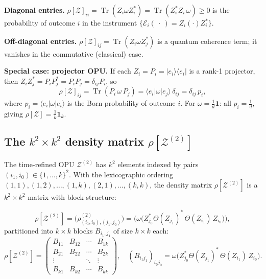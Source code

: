 \documentclass[12pt,a4paper]{article}
\DeclareMathOperator{\Tr}{Tr}
\begin{document}
\noindent\textbf{Diagonal entries.}
$\rho[\mathcal{Z}]_{ii} = \Tr(Z_i\omega Z_i^*) = \Tr(Z_i^*Z_i\,\omega) \geq 0$
is the probability of outcome $i$ in the instrument $\{\mathcal{E}_i(\ \cdot\ )=Z_i(\cdot)Z_i^*\}$.

\noindent\textbf{Off-diagonal entries.}
$\rho[\mathcal{Z}]_{ij} = \Tr(Z_i\omega Z_j^*)$ is a quantum coherence term;
it vanishes in the commutative (classical) case.

\noindent\textbf{Special case: projector OPU.}  If each $Z_i=P_i=|e_i\rangle\langle e_i|$
is a rank-1 projector, then $Z_i Z_j^* = P_i P_j^* = P_i P_j = \delta_{ij}P_i$, so
\begin{equation}
  \rho[\mathcal{Z}]_{ij}
  = \Tr(P_i\,\omega\,P_j)
  = \langle e_i|\omega|e_j\rangle\,\delta_{ij}
  = \delta_{ij}\,p_i,
\end{equation}
where $p_i=\langle e_i|\omega|e_i\rangle$ is the Born probability of outcome $i$.
For $\omega=\frac{1}{d}\mathbf{1}$: all $p_i=\frac{1}{d}$, giving
$\rho[\mathcal{Z}]=\frac{1}{k}\mathbf{1}_k$.

\subsection{The \texorpdfstring{$k^2\times k^2$}{k2 x k2} density matrix \texorpdfstring{$\rho[\mathcal{Z}^{(2)}]$}{rho[Z(2)]}}

The time-refined OPU $\mathcal{Z}^{(2)}$ has $k^2$ elements indexed by pairs
$(i_1,i_0)\in\{1,\ldots,k\}^2$.  With the lexicographic ordering
$(1,1),(1,2),\ldots,(1,k),(2,1),\ldots,(k,k)$, the density matrix
$\rho[\mathcal{Z}^{(2)}]$ is a $k^2\times k^2$ matrix with block structure:

\begin{equation}\label{eq:rho2_block}
\rho[\mathcal{Z}^{(2)}]
= \bigl(\rho^{(2)}_{(i_1,i_0),(j_1,j_0)}\bigr)
= \bigl(\omega\bigl(Z_{j_0}^*\Theta(Z_{j_1})^*\,\Theta(Z_{i_1})\,Z_{i_0}\bigr)\bigr),
\end{equation}
partitioned into $k\times k$ blocks $B_{i_1,j_1}$ of size $k\times k$ each:
\begin{equation}\label{eq:rho2_blocks}
\rho[\mathcal{Z}^{(2)}]
= \begin{pmatrix}
  B_{11} & B_{12} & \cdots & B_{1k} \\
  B_{21} & B_{22} & \cdots & B_{2k} \\
  \vdots &        & \ddots & \vdots \\
  B_{k1} & B_{k2} & \cdots & B_{kk}
\end{pmatrix}, \quad
(B_{i_1 j_1})_{i_0 j_0}
= \omega\bigl(Z_{j_0}^*\Theta(Z_{j_1})^*\,\Theta(Z_{i_1})\,Z_{i_0}\bigr).
\end{equation}
\end{document}
